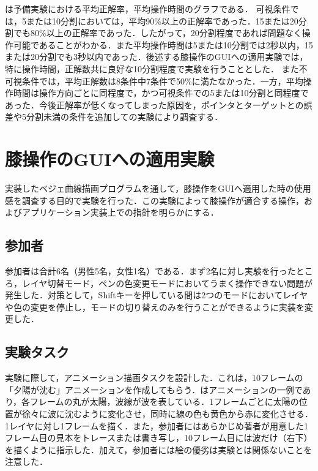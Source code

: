 \documentclass[submit, techrep]{ipsj}
\begin{document}
は予備実験における平均正解率，平均操作時間のグラフである．
可視条件では，5または10分割においては，平均90\%以上の正解率であった．15または20分割でも80\%以上の正解率であった．したがって，20分割程度であれば問題なく操作可能であることがわかる．また平均操作時間は5または10分割では2秒以内，15または20分割でも3秒以内であった．後述する膝操作のGUIへの適用実験では，特に操作時間，正解数共に良好な10分割程度で実験を行うこととした．
また不可視条件では，平均正解数は8条件中7条件で50\%に満たなかった．一方，平均操作時間は操作方向ごとに同程度で，かつ可視条件での5または10分割と同程度であった．今後正解率が低くなってしまった原因を，ポインタとターゲットとの誤差や5分割未満の条件を追加しての実験により調査する．
\section{膝操作のGUIへの適用実験}
実装したベジェ曲線描画プログラムを通して，膝操作をGUIへ適用した時の使用感を調査する目的で実験を行った．この実験によって膝操作が適合する操作，およびアプリケーション実装上での指針を明らかにする．
\subsection{参加者}
参加者は合計6名（男性5名，女性1名）である．まず2名に対し実験を行ったところ，レイヤ切替モード，ペンの色変更モードにおいてうまく操作できない問題が発生した．対策として，Shiftキーを押している間は2つのモードにおいてレイヤや色の変更を停止し，モードの切り替えのみを行うことができるように実装を変更した．
\subsection{実験タスク}
実験に際して，アニメーション描画タスクを設計した．これは，10フレームの「夕陽が沈む」アニメーションを作成してもらう．はアニメーションの一例であり，各フレームの丸が太陽，波線が波を表している．1フレームごとに太陽の位置が徐々に波に沈むように変化させ，同時に線の色も黄色から赤に変化させる．1レイヤに対し1フレームを描く．また，参加者にはあらかじめ著者が用意した1フレーム目の見本をトレースまたは書き写し，10フレーム目には波だけ（右下）を描くように指示した．加えて，参加者には絵の優劣は実験とは関係ないことを注意した．
\end{document}
